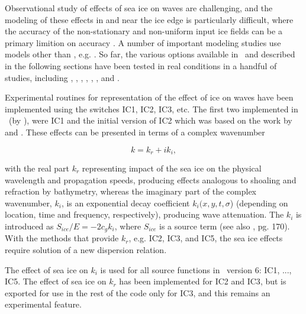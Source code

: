 Observational study of effects of sea ice on waves are challenging, and the modeling of these effects in and near the ice edge is particularly difficult, where the accuracy of the non-stationary and non-uniform input ice fields can be a primary limition on accuracy \citep{rep:RPLA18}. A number of important modeling studies use models other than \ws, e.g. \cite{art:DB13}. So far, the various options available in \ws\ and described in the following sections have been tested in real conditions in a handful of studies, including \cite{art:LKS15}, \cite{art:Aea16}, \cite{art:WHR16}, \cite{art:RTS16}, \cite{rep:RPLA18}, \cite{art:CRT17}, and \cite{Liu2020}.


\noindent
Experimental routines for representation of the effect of ice on waves have
been implemented using the switches {\code IC1}, {\code IC2}, {\code IC3}, etc. The first two implemented in \ws\ (by \cite{rep:RO13}), were {\code IC1} and the initial version of {\code IC2} which was based on the work by \cite{art:LMC88} and \cite{art:LHV91}. These effects can be presented in terms of a complex wavenumber

\begin{equation}\label{eq:waveno}
     {k} = {k_r} + i{k_i},
\end{equation}

\noindent
with the real part ${k_r}$ representing impact of the sea ice on the physical
wavelength and propagation speeds, producing effects analogous to shoaling and
refraction by bathymetry, whereas the imaginary part of the complex
wavenumber, ${k_i}$, is an exponential decay coefficient
${k_i}({x},{y},{t},\sigma $) (depending on location, time and frequency,
respectively), producing wave attenuation.  The ${k_i}$ is introduced as
${S_{ice}}/{E}=-2{c_g}{k_i}$, where ${S_{ice}}$ is a source term (see also
\cite{bk:WAM94}, pg. 170).  With the methods that provide  ${k_r}$, e.g. {\code IC2}, 
{\code IC3}, and {\code IC5}, the sea ice effects 
require solution of a new dispersion relation.

The effect of sea ice on ${k_i}$ is used for all source functions in \ws\ version 6:
{\code IC1}, ..., {\code IC5}. The effect of sea ice on ${k_r}$ has
been implemented for {\code IC2} and {\code IC3}, but is exported for use in
the rest of the code only for {\code IC3}, and this remains an experimental feature.


